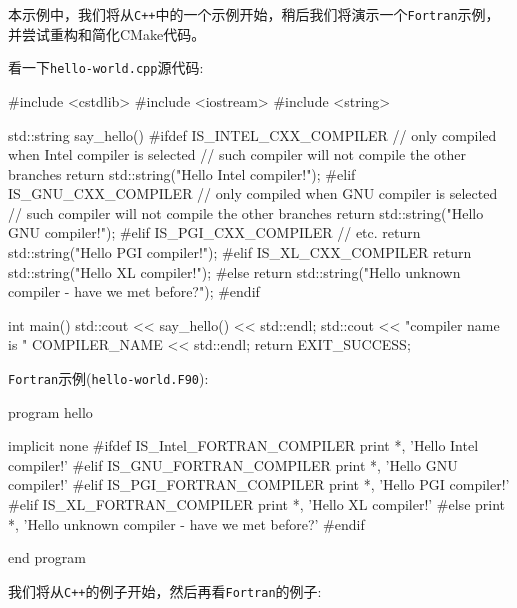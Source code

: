 
本示例中，我们将从\texttt{C++}中的一个示例开始，稍后我们将演示一个\texttt{Fortran}示例，并尝试重构和简化CMake代码。

看一下\texttt{hello-world.cpp}源代码:

\begin{codebox}[cpp]
#include <cstdlib>
#include <iostream>
#include <string>

std::string say_hello() {
#ifdef IS_INTEL_CXX_COMPILER
  // only compiled when Intel compiler is selected
  // such compiler will not compile the other branches
  return std::string("Hello Intel compiler!");
#elif IS_GNU_CXX_COMPILER
  // only compiled when GNU compiler is selected
  // such compiler will not compile the other branches
  return std::string("Hello GNU compiler!");
#elif IS_PGI_CXX_COMPILER
  // etc.
  return std::string("Hello PGI compiler!");
#elif IS_XL_CXX_COMPILER
  return std::string("Hello XL compiler!");
#else
  return std::string("Hello unknown compiler - have we met before?");
#endif
}

int main() {
  std::cout << say_hello() << std::endl;
  std::cout << "compiler name is " COMPILER_NAME << std::endl;
  return EXIT_SUCCESS;
}
\end{codebox}

\texttt{Fortran}示例(\texttt{hello-world.F90}):

\begin{codebox}[fortran]
program hello

  implicit none
#ifdef IS_Intel_FORTRAN_COMPILER
  print *, 'Hello Intel compiler!'
#elif IS_GNU_FORTRAN_COMPILER
  print *, 'Hello GNU compiler!'
#elif IS_PGI_FORTRAN_COMPILER
  print *, 'Hello PGI compiler!'
#elif IS_XL_FORTRAN_COMPILER
  print *, 'Hello XL compiler!'
#else
  print *, 'Hello unknown compiler - have we met before?'
#endif

end program
\end{codebox}


我们将从\texttt{C++}的例子开始，然后再看\texttt{Fortran}的例子:

